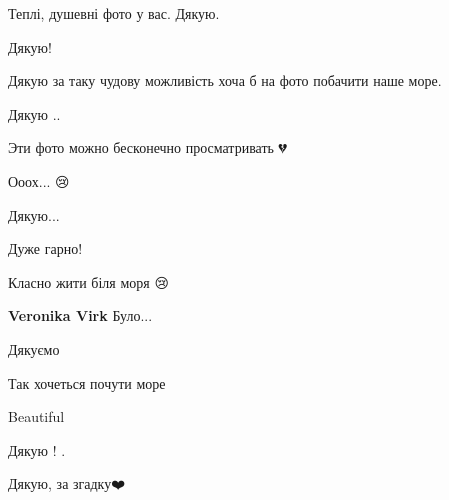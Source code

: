  
 
 
 
 

\qqSecCmt

\raggedcolumns
\begin{multicols}{2} %
\setlength{\parindent}{0pt}


Теплі, душевні фото у вас. Дякую.

Дякую!


Дякую за таку чудову можливість хоча б на фото побачити наше море.


Дякую ..💙💛🙏


Эти фото можно бесконечно просматривать 💔


Ооох... 😢


Дякую...


Дуже гарно!


Класно жити біля моря 😢

\begin{itemize} %
\textbf{Veronika Virk} Було...
\end{itemize} %


Дякуємо

Так хочеться почути море


Beautiful 🌷


Дякую ! .


Дякую, за згадку❤️



\end{multicols}
